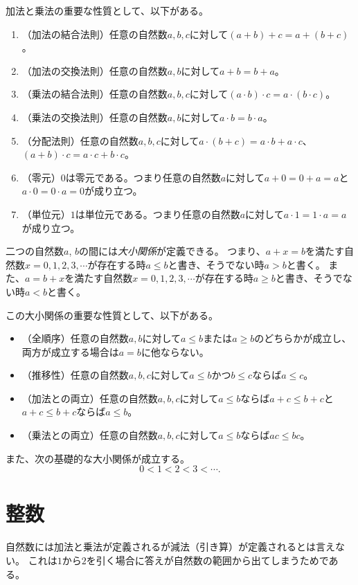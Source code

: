加法と乗法の重要な性質として、以下がある。
\begin{enumerate}
\item
（加法の結合法則）任意の自然数$a, b, c$に対して$(a+b)+c = a+(b+c)$。
\item
（加法の交換法則）任意の自然数$a, b$に対して$a+b = b+a$。
\item
（乗法の結合法則）任意の自然数$a, b, c$に対して$(a\cdot b)\cdot c = a\cdot (b\cdot c)$。
\item
（乗法の交換法則）任意の自然数$a, b$に対して$a\cdot b = b\cdot a$。
\item
（分配法則）任意の自然数$a, b, c$に対して$a\cdot (b+c) = a\cdot b+a\cdot c$、$(a+b)\cdot c = a\cdot c+b\cdot c$。
\item
（零元）$0$は零元である。つまり任意の自然数$a$に対して$a+0 = 0+a = a$と$a\cdot 0 = 0\cdot a = 0$が成り立つ。
\item
（単位元）$1$は単位元である。つまり任意の自然数$a$に対して$a\cdot 1 = 1\cdot a = a$が成り立つ。
\end{enumerate}

二つの自然数$a$, $b$の間には\emph{大小関係}が定義できる。
つまり、$a+x = b$を満たす自然数$x = 0, 1, 2, 3, \cdots$が存在する時$a \le b$と書き、そうでない時$a > b$と書く。
また、$a = b+x$を満たす自然数$x = 0, 1, 2, 3, \cdots$が存在する時$a \ge b$と書き、そうでない時$a < b$と書く。

この大小関係の重要な性質として、以下がある。
\begin{itemize}
\item
（全順序）任意の自然数$a, b$に対して$a \le b$または$a \ge b$のどちらかが成立し、両方が成立する場合は$a = b$に他ならない。
\item
（推移性）任意の自然数$a, b, c$に対して$a \le b$かつ$b \le c$ならば$a \le c$。
\item
（加法との両立）任意の自然数$a, b, c$に対して$a \le b$ならば$a+c \le b+c$と$a+c \le b+c$ならば$a \le b$。
\item
（乗法との両立）任意の自然数$a, b, c$に対して$a \le b$ならば$a c \le b c$。
\end{itemize}

また、次の基礎的な大小関係が成立する。
$$
0 < 1 < 2 < 3 < \cdots.
$$

\section{整数}

自然数には加法と乗法が定義されるが減法（引き算）が定義されるとは言えない。
これは$1$から$2$を引く場合に答えが自然数の範囲から出てしまうためである。

